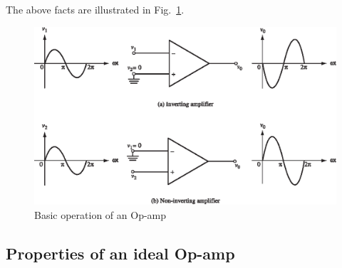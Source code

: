 The above facts are illustrated in Fig.~\ref{fig5.2}.
\begin{figure}[H]
\centering
\includegraphics{chap4/S3-EE-06-002.eps}
\caption{Basic operation of an Op-amp}\label{fig5.2}
\end{figure}

\subsection{Properties of an ideal Op-amp}\label{sec5.1.3}

